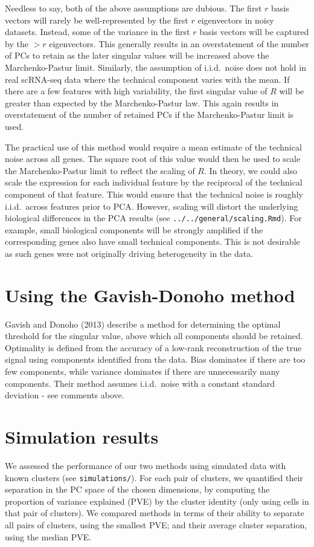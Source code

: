 \documentclass{article}
\begin{document}
Needless to say, both of the above assumptions are dubious.
The first $r$ basis vectors will rarely be well-represented by the first $r$ eigenvectors in noisy datasets.
Instead, some of the variance in the first $r$ basis vectors will be captured by the $>r$ eigenvectors.
This generally results in an overstatement of the number of PCs to retain as the later singular values will be increased above the Marchenko-Pastur limit.
Similarly, the assumption of i.i.d.\ noise does not hold in real scRNA-seq data where the technical component varies with the mean.
If there are a few features with high variability, the first singular value of $R$ will be greater than expected by the Marchenko-Pastur law.
This again results in overstatement of the number of retained PCs if the Marchenko-Pastur limit is used. 

The practical use of this method would require a mean estimate of the technical noise across all genes.
The square root of this value would then be used to scale the Marchenko-Pastur limit to reflect the scaling of $R$.
In theory, we could also scale the expression for each individual feature by the reciprocal of the technical component of that feature.
This would ensure that the technical noise is roughly i.i.d.\ across features prior to PCA.
However, scaling will distort the underlying biological differences in the PCA results (see \verb!../../general/scaling.Rmd!).
For example, small biological components will be strongly amplified if the corresponding genes also have small technical components.
This is not desirable as such genes were not originally driving heterogeneity in the data.

\section{Using the Gavish-Donoho method}
Gavish and Donoho (2013) describe a method for determining the optimal threshold for the singular value, above which all components should be retained.
Optimality is defined from the accuracy of a low-rank reconstruction of the true signal using components identified from the data.
Bias dominates if there are too few components, while variance dominates if there are unnecessarily many components.
Their method assumes i.i.d.\ noise with a constant standard deviation - see comments above.

\section{Simulation results}
We assessed the performance of our two methods using simulated data with known clusters (see \texttt{simulations/}).
For each pair of clusters, we quantified their separation in the PC space of the chosen dimensions,
by computing the proportion of variance explained (PVE) by the cluster identity (only using cells in that pair of clusters).
We compared methods in terms of their ability to separate all pairs of clusters, using the smallest PVE;
and their average cluster separation, using the median PVE.
\end{document}
